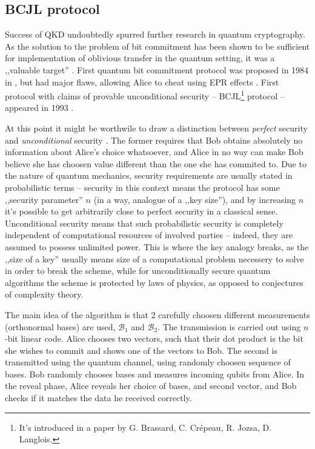 \documentclass[10pt]{article}
\begin{document}
\subsection*{BCJL protocol}

Success of QKD undoubtedly spurred further research in quantum cryptography. As the solution to the 
problem of bit commitment has been shown to be sufficient for implementation of oblivious transfer
in the quantum setting, it was a ,,valuable target'' \cite{Crepeau88,Bennet92}. First quantum bit
commitment protocol was proposed in 1984 in \cite{bb84}\footnotemark, but had major flaws, allowing
Alice to cheat using EPR effects \cite{bcjl93}. First protocol with claims of provable unconditional
security -- BCJL\footnote{It's introduced in a paper by G. Brassard, C. Cr\'{e}peau, R. Jozsa, 
D. Langlois.} protocol -- appeared in 1993 \cite{bcjl93}.


At this point it might be worthwile to draw a distinction between \emph{perfect} security and
\emph{unconditional} security \cite{Mayers97}. The former requires that Bob obtains absolutely no 
information about Alice's choice whatsoever, and Alice in no way can make Bob believe she has choosen 
value different than the one she has commited to. Due to the nature of quantum mechanics, security 
requirements are usually stated in probabilistic terms -- security in this context means the 
protocol has some ,,security parameter'' \(n\) (in a way, analogue of a ,,key size''), and by increasing
\(n\) it's possible to get arbitrarily close to perfect security in a classical sense. Unconditional
security means that such probabilistic security is completely independent of computational resources
of involved parties -- indeed, they are assumed to possess unlimited power. This is where the
key analogy breaks, as the ,,size of a key'' usually means size of a computational problem necessery
to solve in order to break the scheme, while for unconditionally secure quantum algorithms the
scheme is protected by laws of physics, as opposed to conjectures of complexity theory.

The main idea of the algorithm is that 2 carefully choosen different measurements (orthonormal bases) 
are used, \(\mathcal{B}_1\) and \(\mathcal{B}_2\). The transmission is carried out using \(n\)-bit 
linear code. Alice chooses two vectors, such that their dot product is the bit she wishes to commit and
shows one of the vectors to Bob. The second is transmitted using the quantum channel, using randomly
choosen sequence of bases. Bob randomly chooses bases and measures incoming qubits from Alice. In the
reveal phase, Alice reveals her choice of bases, and second vector, and Bob checks if it matches
the data he received correctly.
\end{document}
